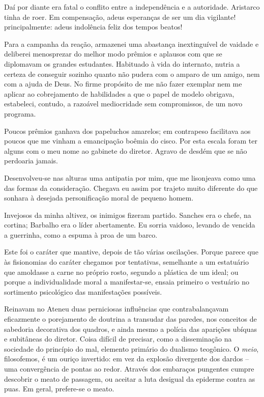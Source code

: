 Daí por diante
era fatal o conflito entre a independência e a autoridade. Aristarco
tinha de roer. Em compensação, adeus esperanças de ser um dia
vigilante! principalmente: adeus indolência feliz dos tempos beatos!

Para a campanha da reação, armazenei uma abastança inextinguível de
vaidade e deliberei menosprezar do melhor modo prêmios e aplausos com
que se diplomavam os grandes estudantes. Habituado à vida do internato,
nutria a certeza de conseguir sozinho quanto não pudera com o amparo de
um amigo, nem com a ajuda de Deus. No firme propósito de me não fazer
exemplar nem me aplicar ao cobrejamento de habilidades a que o papel de
modelo obrigava, estabeleci, contudo, a razoável mediocridade sem
compromissos, de um novo programa. 

Poucos prêmios ganhava dos
papeluchos amarelos; em contrapeso facilitava aos poucos que me vinham
a emancipação boêmia do cisco. Por esta escala foram ter alguns com o
meu nome ao gabinete do diretor. Agravo de desdém que se não perdoaria
jamais. 

Desenvolveu{}-se nas alturas uma antipatia por mim, que me
lisonjeava como uma das formas da consideração. Chegava eu assim por
trajeto muito diferente do que sonhara à desejada personificação moral
de pequeno homem. 

Invejosos da minha altivez, os inimigos fizeram
partido. Sanches era o chefe, na cortina; Barbalho era o líder
abertamente. Eu sorria vaidoso, levando de vencida a guerrinha, como a
espuma à proa de um barco. 

Este foi o caráter que mantive, depois de
tão várias oscilações. Porque parece que às fisionomias do caráter
chegamos por tentativas, semelhante a um estatuário que amoldasse a
carne no próprio rosto, segundo a plástica de um ideal; ou porque a
individualidade moral a manifestar{}-se, ensaia primeiro o vestuário no
sortimento psicológico das manifestações possíveis. 

Reinavam no Ateneu duas perniciosas influências 
que contrabalançavam eficazmente o
porejamento de doutrina a transudar das paredes, nos conceitos de
sabedoria decorativa dos quadros, e ainda mesmo a polícia das aparições
ubíquas e subitâneas do diretor. Coisa difícil de precisar, como a
disseminação na sociedade do princípio do mal, elemento primário do
dualismo teogônico. O \textit{meio}, filosofemos, é um ouriço invertido: em vez
da explosão divergente dos dardos -- uma convergência de pontas ao
redor. Através dos embaraços pungentes cumpre descobrir o meato de
passagem, ou aceitar a luta desigual da epiderme contra as puas. Em
geral, prefere{}-se o meato. 

